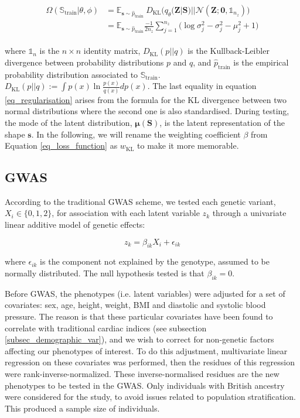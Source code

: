 \begin{align}
\begin{split}
\Omega(\mathbb{S}_\text{train}|\theta, \phi)&= \mathbb{E}_{\mathbf{s}\sim\hat{p}_{\text{train}}}\
D_{\text{KL}}\Big(q_{\theta}(\textbf{Z}|\textbf{S})||\mathcal{N}(\mathbf{Z};\mathbf{0}, \mathbb{1}_{n_z})\Big)\\
&=\mathbb{E}_{\mathbf{s}\sim\hat{p}_{\text{train}}}
\frac{-1}{2n_z}\sum_{j=1}^{n_z}\Big(\log\sigma^2_j-\sigma^2_j-\mu^2_j+1\Big)
\label{eq_regularisation}
\end{split}
\end{align}

\noindent where $\mathbb{1}_{n}$ is the $n\times n$ identity matrix, $D_{\text{KL}}(p||q)$ is the Kullback-Leibler divergence between probability distributions $p$ and $q$, and $\hat{p}_{\text{train}}$ is the empirical probability distribution associated to $\mathbb{S}_\text{train}$.
$D_{\text{KL}}(p||q):=\int p(x)\ln{\frac{p(x)}{q(x)}}dp(x)$. The last equality in equation \ref{eq_regularisation} arises
from the formula for the KL divergence between two normal distributions where the second one is also standardised. During testing, the mode of the latent distribution, $\pmb{\mu}(\textbf{S})$, is the latent representation of the shape $\textbf{s}$. In the following, we will rename the weighting coefficient $\beta$ from Equation \ref{eq_loss_function} as $w_{\text{KL}}$ to make it more memorable.

\subsection{GWAS}
According to the traditional GWAS scheme, we tested each genetic variant, $X_i\in\{0,1,2\}$, for association with each latent variable $z_k$ through a univariate linear additive model of genetic effects:

\begin{equation}
z_k = \beta_{ik}X_i+\epsilon_{ik}
\label{eq_gwas}
\end{equation}

\noindent where $\epsilon_{ik}$ is the component not explained by the genotype, assumed to be normally distributed. The null hypothesis tested is that $\beta_{ik}=0$. 

Before GWAS, the phenotypes (i.e. latent variables) were adjusted for a set of covariates: sex, age, height, weight, BMI and diastolic and systolic blood pressure. The reason is that these particular covariates have been found to correlate with traditional cardiac indices (see subsection \ref{subsec_demographic_var}), and we wish to correct for non-genetic factors affecting our phenotypes of interest. To do this adjustment, multivariate linear regression on these covariates was performed, then the residues of this regression were rank-inverse-normalized. These inverse-normalised residues are the new phenotypes to be tested in the GWAS. Only individuals with British ancestry were considered for the study, to avoid issues related to population stratification. This produced a sample size of \NCMRGBR individuals.

